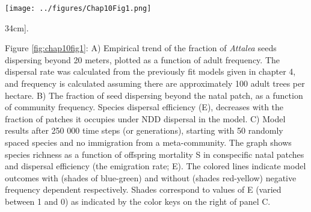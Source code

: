 \documentclass[b5paper,justified]{tufte-book} %
\begin{document}
\begin{fullwidth}
\begin{figure*}
\hspace*{.5cm}\texttt{[image: ../figures/Chap10Fig1.png]}
\caption[A community model of negative density-dependent dispersal][34cm]{.}
\label{fig:chap10fig1}
\footnotesize
\hspace*{1cm} \begin{minipage}{11cm}
\vspace*{0.1cm}
Figure \ref{fig:chap10fig1}: 
A) Empirical trend of the fraction of \textit{Attalea} seeds dispersing beyond 20 meters, plotted as a function of adult frequency. The dispersal rate was calculated from the previously fit models given in chapter 4, and frequency is calculated assuming there are approximately 100 adult trees per hectare.  
B) The fraction of seed dispersing beyond the natal patch, as a function of community frequency. Species dispersal efficiency (E), decreases with the fraction of patches it occupies under NDD dispersal in the model. 
C)  Model results after 250 000 time steps (or generations), starting with 50 randomly spaced species and no immigration from a meta-community. The graph shows species richness as a function of offspring mortality S in conspecific natal patches and dispersal efficiency (the emigration rate; E). The colored lines indicate model outcomes with (shades of blue-green) and without (shades red-yellow) negative frequency dependent respectively.  Shades correspond to values of E (varied between 1 and 0) as indicated by the color keys on the right of panel C.
\end{minipage}
\end{figure*}


\end{fullwidth}
\end{document}
